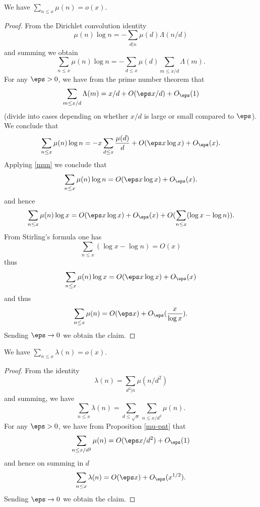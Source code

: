 \begin{proposition}\label{mu-pnt}  We have $\sum_{n \leq x} \mu(n) = o(x)$.
\end{proposition}

\begin{proof}
From the Dirichlet convolution identity
  $$ \mu(n) \log n = - \sum_{d|n} \mu(d) \Lambda(n/d)$$
and summing we obtain
$$ \sum_{n \leq x} \mu(n) \log n = - \sum_{d \leq x} \mu(d) \sum_{m \leq x/d} \Lambda(m).$$
For any $\eps>0$, we have from the prime number theorem that
$$ \sum_{m \leq x/d} \Lambda(m) = x/d + O(\eps x/d) + O_\eps(1)$$
(divide into cases depending on whether $x/d$ is large or small compared to $\eps$).
We conclude that
$$ \sum_{n \leq x} \mu(n) \log n = - x \sum_{d \leq x} \frac{\mu(d)}{d} + O(\eps x \log x) + O_\eps(x).$$
Applying \eqref{mun} we conclude that
$$ \sum_{n \leq x} \mu(n) \log n = O(\eps x \log x) + O_\eps(x).$$
and hence
$$ \sum_{n \leq x} \mu(n) \log x = O(\eps x \log x) + O_\eps(x) + O( \sum_{n \leq x} (\log x - \log n) ).$$
From Stirling's formula one has
$$  \sum_{n \leq x} (\log x - \log n) = O(x)$$
thus
$$ \sum_{n \leq x} \mu(n) \log x = O(\eps x \log x) + O_\eps(x)$$
and thus
$$ \sum_{n \leq x} \mu(n) = O(\eps x) + O_\eps(\frac{x}{\log x}).$$
Sending $\eps \to 0$ we obtain the claim.
\end{proof}


\begin{proposition}  \label{lambda-pnt}
We have $\sum_{n \leq x} \lambda(n) = o(x)$.
\end{proposition}

\begin{proof}
From the identity
  $$ \lambda(n) = \sum_{d^2|n} \mu(n/d^2)$$
and summing, we have
$$ \sum_{n \leq x} \lambda(n) = \sum_{d \leq \sqrt{x}} \sum_{n \leq x/d^2} \mu(n).$$
For any $\eps>0$, we have from Proposition \ref{mu-pnt} that
$$ \sum_{n \leq x/d^2} \mu(n) = O(\eps x/d^2) + O_\eps(1)$$
and hence on summing in $d$
$$ \sum_{n \leq x} \lambda(n) = O(\eps x) + O_\eps(x^{1/2}).$$
Sending $\eps \to 0$ we obtain the claim.
\end{proof}




